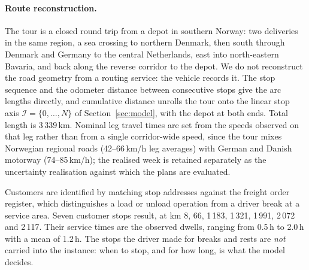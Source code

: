 \paragraph{Route reconstruction.}
The tour is a closed round trip from a depot in southern Norway: two
deliveries in the same region, a sea crossing to northern Denmark, then south
through Denmark and Germany to the central Netherlands, east into
north-eastern Bavaria, and back along the reverse corridor to the depot.  We
do not reconstruct the road geometry from a routing service: the vehicle
records it.  The stop sequence and the odometer distance between consecutive
stops give the arc lengths directly, and cumulative distance unrolls the tour
onto the linear stop axis $\mathcal I = \{0,\dots,N\}$ of
Section~\ref{sec:model}, with the depot at both ends.  Total length is
$3\,339$\,km.  Nominal leg travel times are set from the speeds observed on
that leg rather than from a single corridor-wide speed, since the tour mixes
Norwegian regional roads (42--66\,km/h leg averages) with German and Danish
motorway (74--85\,km/h); the realised week is retained separately as the
uncertainty realisation against which the plans are evaluated.

Customers are identified by matching stop addresses against the freight order
register, which distinguishes a load or unload operation from a driver break
at a service area.  Seven customer stops result, at km 8, 66, 1\,183, 1\,321,
1\,991, 2\,072 and 2\,117.  Their service times are the observed dwells,
ranging from 0.5\,h to 2.0\,h with a mean of 1.2\,h.  The stops the driver made
for breaks and rests are \emph{not} carried into the instance: when to stop,
and for how long, is what the model decides.

